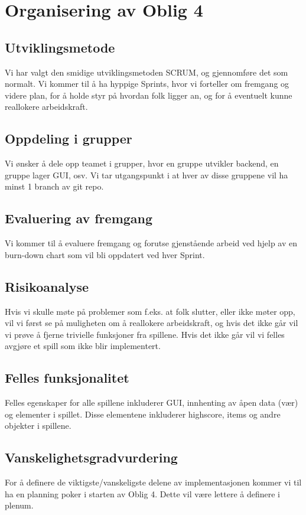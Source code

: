 \documentclass[12pt]{report}
\begin{document}

\section*{Organisering av Oblig 4}

\subsection*{Utviklingsmetode}

Vi har valgt den smidige utviklingsmetoden SCRUM, og gjennomf{\o}re det som normalt. 
Vi kommer til {\aa} ha hyppige Sprints, hvor vi forteller om fremgang og videre plan, 
for {\aa} holde styr p{\aa} hvordan folk ligger an, og for {\aa} eventuelt kunne reallokere arbeidskraft.

\subsection*{Oppdeling i grupper}

Vi {\o}nsker {\aa} dele opp teamet i grupper, hvor en gruppe utvikler backend, en gruppe lager GUI, osv.
Vi tar utgangspunkt i at hver av disse gruppene vil ha minst 1 branch av git repo.

\subsection*{Evaluering av fremgang}

Vi kommer til {\aa} evaluere fremgang og forutse gjenst{\aa}ende arbeid 
ved hjelp av en burn-down chart som vil bli oppdatert ved hver Sprint.

\subsection*{Risikoanalyse}

Hvis vi skulle m{\o}te p{\aa} problemer som f.eks. at folk slutter, eller ikke m{\o}ter opp, 
vil vi f{\o}rst se p{\aa} muligheten om {\aa} reallokere arbeidskraft, 
og hvis det ikke g{\aa}r vil vi pr{\o}ve {\aa} fjerne trivielle funksjoner fra spillene. 
Hvis det ikke g{\aa}r vil vi felles avgj{\o}re et spill som ikke blir implementert.

\subsection*{Felles funksjonalitet}

Felles egenskaper for alle spillene inkluderer GUI, 
innhenting av {\aa}pen data (v{\ae}r) og elementer i spillet.
Disse elementene inkluderer highscore, items og andre objekter i spillene.

\subsection*{Vanskelighetsgradvurdering}

For {\aa} definere de viktigste/vanskeligste delene av implementasjonen
kommer vi til ha en planning poker i starten av Oblig 4.
Dette vil v{\ae}re lettere {\aa} definere i plenum.
\end{document}
